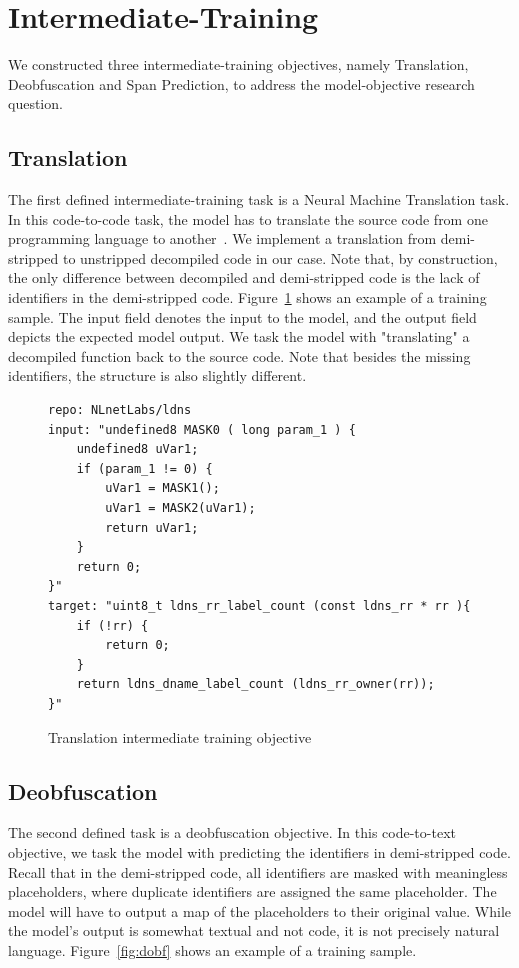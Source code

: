 \section{Intermediate-Training}

We constructed three intermediate-training objectives, namely Translation, Deobfuscation and Span Prediction, to address the model-objective research question.

\subsection{Translation}
The first defined intermediate-training task is a Neural Machine Translation task. In this code-to-code task, the model has to translate the source code from one programming language to another~\cite{CodeXGlue}. 
We implement a translation from demi-stripped to unstripped decompiled code in our case. Note that, by construction, the only difference between decompiled and demi-stripped code is the lack of identifiers in the demi-stripped code. Figure~\ref{fig:tanslation} shows an example of a training sample. The input field denotes the input to the model, and the output field depicts the expected model output. We task the model with "translating" a decompiled function back to the source code. Note that besides the missing identifiers, the structure is also slightly different.

\begin{figure}[tbh]
  \centering
\begin{verbatim}
repo: NLnetLabs/ldns
input: "undefined8 MASK0 ( long param_1 ) { 
    undefined8 uVar1; 
    if (param_1 != 0) { 
        uVar1 = MASK1(); 
        uVar1 = MASK2(uVar1); 
        return uVar1; 
    } 
    return 0; 
}"
target: "uint8_t ldns_rr_label_count (const ldns_rr * rr ){ 
    if (!rr) { 
        return 0;
    } 
    return ldns_dname_label_count (ldns_rr_owner(rr));
}"
\end{verbatim}
  \caption{Translation intermediate training objective}
  \label{fig:tanslation}
\end{figure}

\subsection{Deobfuscation}
The second defined task is a deobfuscation objective. In this code-to-text objective, we task the model with predicting the identifiers in demi-stripped code. Recall that in the demi-stripped code, all identifiers are masked with meaningless placeholders, where duplicate identifiers are assigned the same placeholder. The model will have to output a map of the placeholders to their original value. While the model's output is somewhat textual and not code, it is not precisely natural language. Figure~\ref{fig:dobf} shows an example of a training sample. 
 
